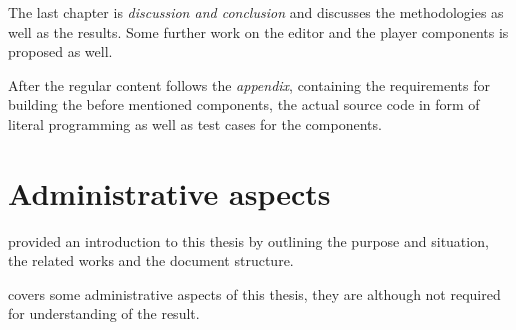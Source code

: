 \documentclass[%
    a4paper,    %
    justified,  %
    nobib,      %
    openany     %
]{tufte-book}
\begin{document}

The last chapter is \textit{discussion and conclusion} and discusses the
methodologies as well as the results. Some further work on the editor and the
player components is proposed as well.

After the regular content follows the \textit{appendix}, containing the
requirements for building the before mentioned components, the actual source
code in form of literal programming as well as test cases for the components.

\chapter{Administrative aspects}
\label{chap:administrative_aspects}

 provided an introduction to this thesis by
outlining the purpose and situation, the related works and the document
structure.

 covers some administrative aspects of this thesis,
they are although not required for understanding of the result.
\end{document}
